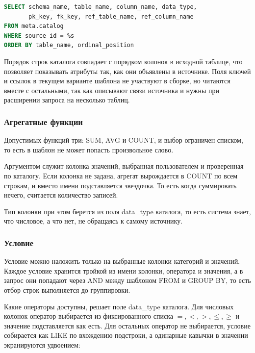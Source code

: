 \documentclass[areasetadvanced]{scrartcl}
\begin{document}
\begin{lstlisting}[language=SQL, caption={Запрос к каталогу метаданных}, label={lis:catalog_sql}]
SELECT schema_name, table_name, column_name, data_type,
       pk_key, fk_key, ref_table_name, ref_column_name
FROM meta.catalog
WHERE source_id = %s
ORDER BY table_name, ordinal_position
\end{lstlisting}

Порядок строк каталога совпадает с порядком колонок в исходной таблице, что позволяет показывать атрибуты так,
как они объявлены в источнике. Поля ключей и ссылок в текущем варианте шаблона
не участвуют в сборке, но читаются вместе с остальными, так как описывают связи источника и нужны при расширении
запроса на несколько таблиц.

        \subsubsection{Агрегатные функции}
Допустимых функций три: SUM, AVG и COUNT,
и выбор ограничен списком, то есть в шаблон не может попасть произвольное слово.

Аргументом служит колонка значений, выбранная пользователем и проверенная по каталогу. Если колонка не задана,
агрегат вырождается в COUNT по всем строкам, и вместо имени подставляется звездочка. 
То есть когда суммировать нечего, считается количество записей.

Тип колонки при этом берется из поля data\_type каталога, то есть система знает, что числовое, а что нет,
не обращаясь к самому источнику.

        \subsubsection{Условие}
Условие можно наложить только на выбранные колонки категорий и значений. Каждое условие хранится
тройкой из имени колонки, оператора и значения, а в запрос они попадают через AND
между шаблоном FROM и GROUP BY, то есть отбор строк выполняется до группировки.

Какие операторы доступны, решает поле data\_type каталога. Для числовых колонок оператор выбирается из фиксированного
списка $=, <, >, \leq, \geq$ и значение подставляется как есть. Для остальных оператор не выбирается,
условие собирается как LIKE по вхождению подстроки, а одинарные кавычки в значении экранируются удвоением:
\end{document}
